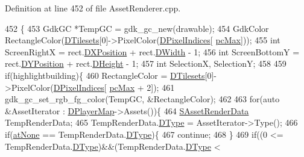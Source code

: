 Definition at line 452 of file Asset\+Renderer.\+cpp.


\begin{DoxyCode}
452                                                                                                            
                                                                                              \{
453     GdkGC *TempGC = gdk\_gc\_new(drawable);
454     GdkColor RectangleColor(\hyperlink{classCAssetRenderer_ae8201de704851c1de6424a8da77b785e}{DTilesets}[0]->PixelColor(\hyperlink{classCAssetRenderer_aa1d9cd6de6b897ec0b5a244bf822e6bd}{DPixelIndices}[
      \hyperlink{GameDataTypes_8h_aafb0ca75933357ff28a6d7efbdd7602fa594a5c8dd3987f24e8a0f23f1a72cd34}{pcMax}]));
455     \textcolor{keywordtype}{int} ScreenRightX = rect.\hyperlink{structSRectangle_abcbddb03b3ee416cc33109833b5f075c}{DXPosition} + rect.\hyperlink{structSRectangle_a4150898b3f7d90f6e4b0d44bf1ae3bd2}{DWidth} - 1;
456     \textcolor{keywordtype}{int} ScreenBottomY = rect.\hyperlink{structSRectangle_a120aa0a90033bc6e07c36c151a3bbc71}{DYPosition} + rect.\hyperlink{structSRectangle_a84ea3c2314c43cab6186170662188899}{DHeight} - 1;
457     \textcolor{keywordtype}{int} SelectionX, SelectionY;
458     
459     \textcolor{keywordflow}{if}(highlightbuilding)\{
460         RectangleColor = \hyperlink{classCAssetRenderer_ae8201de704851c1de6424a8da77b785e}{DTilesets}[0]->PixelColor(\hyperlink{classCAssetRenderer_aa1d9cd6de6b897ec0b5a244bf822e6bd}{DPixelIndices}[
      \hyperlink{GameDataTypes_8h_aafb0ca75933357ff28a6d7efbdd7602fa594a5c8dd3987f24e8a0f23f1a72cd34}{pcMax} + 2]);
461         gdk\_gc\_set\_rgb\_fg\_color(TempGC, &RectangleColor);
462         
463         \textcolor{keywordflow}{for}(\textcolor{keyword}{auto} &AssetIterator : \hyperlink{classCAssetRenderer_a422a3f7e4202e73431fba7036e494dfe}{DPlayerMap}->Assets())\{
464             \hyperlink{structSAssetRenderData}{SAssetRenderData} TempRenderData;
465             TempRenderData.\hyperlink{structSAssetRenderData_ae986cfe9d4238fa31fb511b40392d97f}{DType} = AssetIterator->Type();
466             \textcolor{keywordflow}{if}(\hyperlink{GameDataTypes_8h_a5600d4fc433b83300308921974477feca82fb51718e2c00981a2d37bc6fe92593}{atNone} == TempRenderData.\hyperlink{structSAssetRenderData_ae986cfe9d4238fa31fb511b40392d97f}{DType})\{
467                 \textcolor{keywordflow}{continue};   
468             \}
469             \textcolor{keywordflow}{if}((0 <= TempRenderData.\hyperlink{structSAssetRenderData_ae986cfe9d4238fa31fb511b40392d97f}{DType})&&(TempRenderData.\hyperlink{structSAssetRenderData_ae986cfe9d4238fa31fb511b40392d97f}{DType} < 

\end{DoxyCode}
